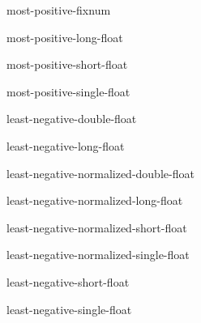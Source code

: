 \begin{constant}{most-positive-fixnum}{}{}{}
  
\end{constant}

\begin{constant}{most-positive-long-float}{}{}{}
  
\end{constant}

\begin{constant}{most-positive-short-float}{}{}{}
  
\end{constant}

\begin{constant}{most-positive-single-float}{}{}{}
  
\end{constant}

\begin{constant}{least-negative-double-float}{}{}{}
  
\end{constant}

\begin{constant}{least-negative-long-float}{}{}{}
  
\end{constant}

\begin{constant}{least-negative-normalized-double-float}{}{}{}
  
\end{constant}

\begin{constant}{least-negative-normalized-long-float}{}{}{}
  
\end{constant}

\begin{constant}{least-negative-normalized-short-float}{}{}{}
  
\end{constant}

\begin{constant}{least-negative-normalized-single-float}{}{}{}
  
\end{constant}

\begin{constant}{least-negative-short-float}{}{}{}
  
\end{constant}

\begin{constant}{least-negative-single-float}{}{}{}
  
\end{constant}


